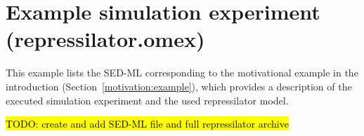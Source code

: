 \section{Example simulation experiment (repressilator.omex)}
\label{example:repressilator}
This example lists the SED-ML corresponding to the motivational example in the introduction (Section~\ref{motivation:example}), which provides a description of the executed simulation experiment and the used repressilator model. 

\hl{TODO: create and add SED-ML file and full repressilator archive}

%
%
%
%
%
%


